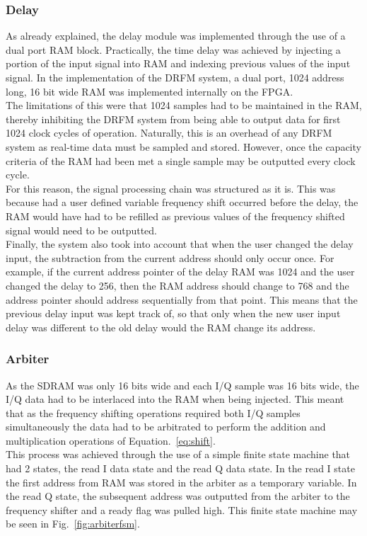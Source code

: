 		\subsubsection{Delay}
		As already explained, the delay module was implemented through the use of a dual port RAM block. Practically, the time delay was achieved by injecting a portion of the input signal into RAM and indexing previous values of the input signal. In the implementation of the DRFM system, a dual port, 1024 address long, 16 bit wide RAM was implemented internally on the FPGA.\\ \newline The limitations of this were that 1024 samples had to be maintained in the RAM, thereby inhibiting the DRFM system from being able to output data for first 1024 clock cycles of operation. Naturally, this is an overhead of any DRFM system as real-time data must be sampled and stored. However, once the capacity criteria of the RAM had been met a single sample may be outputted every clock cycle. \\ \newline For this reason, the signal processing chain was structured as it is. This was because had a user defined variable frequency shift occurred before the delay, the RAM would have had to be refilled as previous values of the frequency shifted signal would need to be outputted.  \\ \newline  Finally, the system also took into account that when the user changed the delay input, the subtraction from the current address should only occur once. For example, if the current address pointer of the delay RAM was 1024 and the user changed the delay to 256, then the RAM address should change to 768 and the address pointer should address sequentially from that point. This means that the previous delay input was kept track of, so that only when the new user input delay was different to the old delay would the RAM change its address. \\
		\subsubsection{Arbiter}
		As the SDRAM was only 16 bits wide and each I/Q sample was 16 bits wide, the I/Q data had to be interlaced into the RAM when being injected. This meant that as the frequency shifting operations required both I/Q samples simultaneously the data had to be arbitrated to perform the addition and multiplication operations of Equation.~\ref{eq:shift}.  \\ \newline This process was achieved through the use of a simple finite state machine that had 2 states, the read I data state and the read Q data state. In the read I state the first address from RAM was stored in the arbiter as a temporary variable. In the read Q state, the subsequent address was outputted from the arbiter to the frequency shifter and a ready flag was pulled high. This finite state machine may be seen in Fig.~\ref{fig:arbiterfsm}.  \\ \newline 
		

